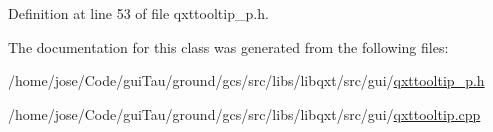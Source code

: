 Definition at line 53 of file qxttooltip\-\_\-p.\-h.



The documentation for this class was generated from the following files\-:\begin{DoxyCompactItemize}
\item 
/home/jose/\-Code/gui\-Tau/ground/gcs/src/libs/libqxt/src/gui/\hyperlink{qxttooltip__p_8h}{qxttooltip\-\_\-p.\-h}\item 
/home/jose/\-Code/gui\-Tau/ground/gcs/src/libs/libqxt/src/gui/\hyperlink{qxttooltip_8cpp}{qxttooltip.\-cpp}\end{DoxyCompactItemize}
